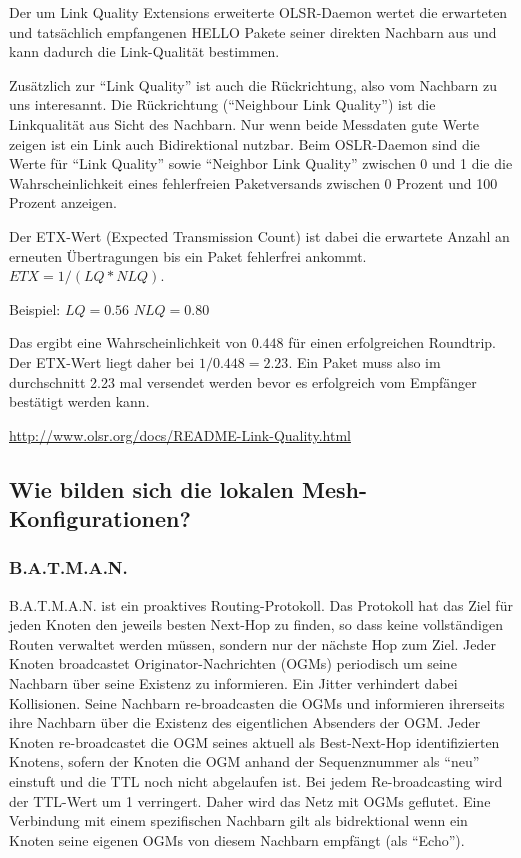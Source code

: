 \documentclass[a4paper,10pt]{article}
\begin{document}
Der um Link Quality Extensions erweiterte OLSR-Daemon wertet die erwarteten und tatsächlich empfangenen
HELLO Pakete seiner direkten Nachbarn aus und kann dadurch die Link-Qualität bestimmen.

Zusätzlich zur "`Link Quality"' ist auch die Rückrichtung, also vom Nachbarn zu uns interesannt.
Die Rückrichtung ("`Neighbour Link Quality"') ist die Linkqualität aus Sicht des Nachbarn.
Nur wenn beide Messdaten gute Werte zeigen ist ein Link auch Bidirektional nutzbar.
Beim OSLR-Daemon sind die Werte für "`Link Quality"' sowie "`Neighbor Link Quality"' zwischen 0 und 1 die die Wahrscheinlichkeit eines fehlerfreien Paketversands zwischen 0 Prozent und 100 Prozent anzeigen.

Der ETX-Wert (Expected Transmission Count) ist dabei die erwartete Anzahl an erneuten Übertragungen bis ein Paket fehlerfrei ankommt.
$ETX= 1/(LQ*NLQ)$.

Beispiel:
$LQ=0.56$
$NLQ=0.80$

Das ergibt eine Wahrscheinlichkeit von $0.448$ für einen erfolgreichen Roundtrip.
Der ETX-Wert liegt daher bei $1/0.448=2.23$. Ein Paket muss also im durchschnitt 2.23 mal versendet werden
bevor es erfolgreich vom Empfänger bestätigt werden kann.

\url{http://www.olsr.org/docs/README-Link-Quality.html}

\subsection{Wie bilden sich die lokalen Mesh-Konfigurationen?}


\subsubsection*{B.A.T.M.A.N.}

B.A.T.M.A.N. ist ein proaktives Routing-Protokoll.
Das Protokoll hat das Ziel für jeden Knoten den jeweils besten Next-Hop zu finden, so dass keine vollständigen Routen verwaltet werden müssen, sondern nur der nächste Hop zum Ziel.
Jeder Knoten broadcastet Originator-Nachrichten (OGMs) periodisch um seine Nachbarn über seine Existenz zu informieren.
Ein Jitter verhindert dabei Kollisionen.
Seine Nachbarn re-broadcasten die OGMs und informieren ihrerseits ihre Nachbarn über die Existenz des eigentlichen Absenders der OGM.
Jeder Knoten re-broadcastet die OGM seines aktuell als Best-Next-Hop identifizierten Knotens, sofern der Knoten die OGM anhand der Sequenznummer als "`neu"' einstuft und die TTL noch nicht abgelaufen ist.
Bei jedem Re-broadcasting wird der TTL-Wert um 1 verringert.
Daher wird das Netz mit OGMs geflutet.
Eine Verbindung mit einem spezifischen Nachbarn gilt als bidrektional wenn ein Knoten seine eigenen OGMs von diesem Nachbarn empfängt (als "`Echo"').
\end{document}

